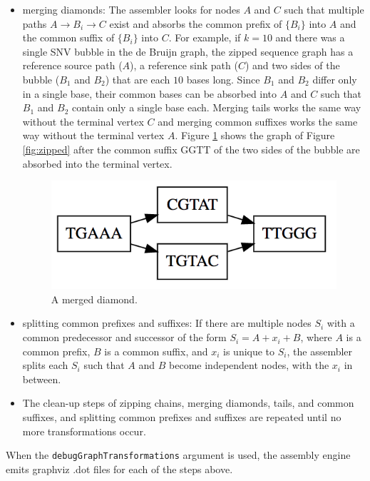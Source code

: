 \documentclass[nofootinbib,amssymb,amsmath]{revtex4}
\newcommand{\code}[1]{\texttt{#1}}
\begin{document}
\begin{itemize}
\item merging diamonds: The assembler looks for nodes $A$ and $C$ such that multiple paths $A \rightarrow B_i \rightarrow C$ exist and absorbs the common prefix of $\{B_i\}$ into $A$ and the common suffix of $\{ B_i \}$ into $C$.  For example, if $k = 10$ and there was a single SNV bubble in the de Bruijn graph, the zipped sequence graph has a reference source path  ($A$), a reference sink path ($C$) and two sides of the bubble ($B_1$ and $B_2$) that are each $10$ bases long.  Since $B_1$ and $B_2$ differ only in a single base, their common bases can be absorbed into $A$ and $C$ such that $B_1$ and $B_2$ contain only a single base each.  Merging tails works the same way without the terminal vertex $C$ and merging common suffixes works the same way without the terminal vertex $A$.  Figure \ref{fig:diamond} shows the graph of Figure \ref{fig:zipped} after the common suffix GGTT of the two sides of the bubble are absorbed into the terminal vertex.

\begin{figure}
\center
\includegraphics[scale=0.5]{diamond.png}
\caption{A merged diamond.}
\label{fig:diamond}
\end{figure}

\item splitting common prefixes and suffixes: If there are multiple nodes $S_i$ with a common predecessor and successor of the form $S_i = A + x_i + B$, where $A$ is a common prefix, $B$ is a common suffix, and $x_i$ is unique to $S_i$, the assembler splits each $S_i$ such that $A$ and $B$ become independent nodes, with the $x_i$ in between.

\item The clean-up steps of zipping chains, merging diamonds, tails, and common suffixes, and splitting common prefixes and suffixes are repeated until no more transformations occur.

\end{itemize}

When the \code{debugGraphTransformations} argument is used, the assembly engine emits graphviz .dot files for each of the steps above.
\end{document}
